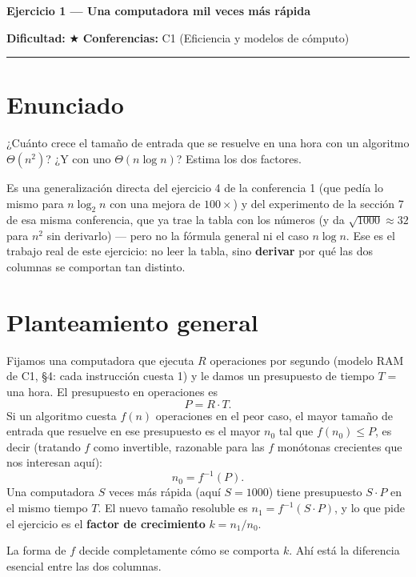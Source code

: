 \documentclass[11pt]{article}
\begin{document}
{\LARGE\bfseries\color{azultitulo} Ejercicio 1 --- Una computadora mil veces más rápida}

\vspace{2pt}
\textbf{Dificultad:} $\bigstar$ \quad \textbf{Conferencias:} C1 (Eficiencia y modelos de cómputo)
\vspace{8pt}
\hrule
\vspace{12pt}

\section*{Enunciado}
\begin{enunciado}
¿Cuánto crece el tamaño de entrada que se resuelve en una hora con un algoritmo $\Theta(n^2)$? ¿Y con uno
$\Theta(n\log n)$? Estima los dos factores.
\end{enunciado}

Es una generalización directa del ejercicio 4 de la conferencia 1 (que pedía lo mismo para $n\log_2 n$ con
una mejora de $100\times$) y del experimento de la sección 7 de esa misma conferencia, que ya trae la
tabla con los números (y da $\sqrt{1000}\approx 32$ para $n^2$ sin derivarlo) --- pero no la fórmula general ni el caso $n\log n$. Ese es el trabajo real de este ejercicio: no
leer la tabla, sino \textbf{derivar} por qué las dos columnas se comportan tan distinto.

\section{Planteamiento general}

Fijamos una computadora que ejecuta $R$ operaciones por segundo (modelo RAM de C1, §4: cada instrucción
cuesta 1) y le damos un presupuesto de tiempo $T =$ una hora. El presupuesto en operaciones es
\[ P = R \cdot T. \]
Si un algoritmo cuesta $f(n)$ operaciones en el peor caso, el mayor tamaño de entrada que resuelve en ese
presupuesto es el mayor $n_0$ tal que $f(n_0)\le P$, es decir (tratando $f$ como invertible, razonable
para las $f$ monótonas crecientes que nos interesan aquí):
\[ n_0 = f^{-1}(P). \]
Una computadora $S$ veces más rápida (aquí $S=1000$) tiene presupuesto $S\cdot P$ en el mismo tiempo $T$.
El nuevo tamaño resoluble es $n_1 = f^{-1}(S\cdot P)$, y lo que pide el ejercicio es el \textbf{factor de
crecimiento} $k = n_1/n_0$.

La forma de $f$ decide completamente cómo se comporta $k$. Ahí está la diferencia esencial entre las dos
columnas.
\end{document}
